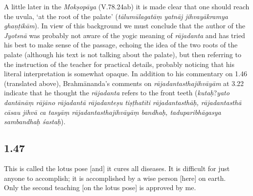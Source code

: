 \begin{ekdosis}
\begin{philcomm}[hp01_045]
A little later in the \emph{Mokṣopāya} (V.78.24ab) it is made clear that one should reach the uvula, `at the root of the palate' (\emph{tālumūlagatāṃ yatnāj jihvayākramya ghaṇṭikām}). In view of this background we must conclude that the author of the \emph{Jyotsnā} was probably not aware of the yogic meaning of \emph{rājadanta} and has tried his best to make sense of the passage,
echoing the idea of the two roots of the palate (although his text is not talking about the palate), but then referring to the instruction of the teacher for practical details, probably noticing that his literal interpretation is somewhat opaque. In addition to his commentary on 1.46 (translated above), Brahmānanda’s comments on \emph{rājadantasthajihvāyām} at 3.22 indicate that he thought the \emph{rājadanta} refers to the front teeth (\emph{kutaḥ}?\emph{yato dantānāṃ rājāno rājadantā rājadanteṣu tiṣṭhatīti rājadantasthāḥ, rājadantasthā cāsau jihvā ca tasyāṃ rājadantasthajihvāyāṃ bandhaḥ, taduparibhāgasya sambandhaḥ śastaḥ}).
\end{philcomm}





\subsection*{1.47}
\begin{translation}[hp01_047]
This is called the lotus pose [and] it cures all diseases. It is difficult for just anyone to accomplish; it is accomplished by a wise person [here] on earth.\\

Only the second teaching [on the lotus pose] is approved by me.  
\end{translation}




\end{ekdosis}
